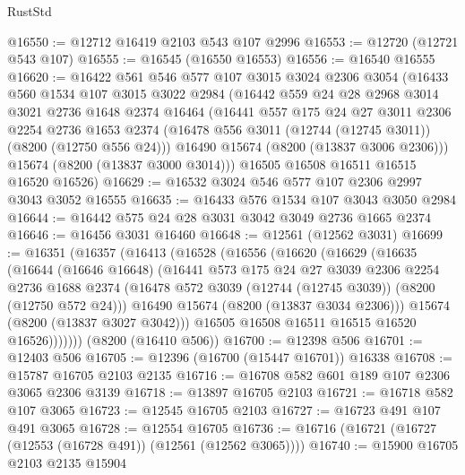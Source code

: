 \begin{lexlean}{RustStd}
\begin{coremodule}
@16550 := @12712 @16419 @2103 @543 @107 @2996
@16553 := @12720 (@12721 @543 @107)
@16555 := @16545 (@16550 @16553)
@16556 := @16540 @16555
@16620 := @16422
    @561
    @546
    @577
    @107
    @3015
    @3024
    @2306
    @3054
    (@16433
      @560
      @1534
      @107
      @3015
      @3022
      @2984
      (@16442
        @559
        @24
        @28
        @2968
        @3014
        @3021
        @2736
        @1648
        @2374
        @16464
        (@16441
          @557
          @175
          @24
          @27
          @3011
          @2306
          @2254
          @2736
          @1653
          @2374
          (@16478 @556 @3011 (@12744 (@12745 @3011)) (@8200 (@12750 @556 @24)))
          @16490
          @15674
          (@8200 (@13837 @3006 @2306)))
        @15674
        (@8200 (@13837 @3000 @3014)))
      @16505
      @16508
      @16511
      @16515
      @16520
      @16526)
@16629 := @16532 @3024 @546 @577 @107 @2306 @2997 @3043 @3052 @16555
@16635 := @16433 @576 @1534 @107 @3043 @3050 @2984
@16644 := @16442 @575 @24 @28 @3031 @3042 @3049 @2736 @1665 @2374
@16646 := @16456 @3031 @16460
@16648 := @12561 (@12562 @3031)
@16699 := @16351
    (@16357
      (@16413
        (@16528
          (@16556
            (@16620
              (@16629
                (@16635
                  (@16644
                    (@16646 @16648)
                    (@16441
                      @573
                      @175
                      @24
                      @27
                      @3039
                      @2306
                      @2254
                      @2736
                      @1688
                      @2374
                      (@16478 @572 @3039 (@12744 (@12745 @3039)) (@8200 (@12750 @572 @24)))
                      @16490
                      @15674
                      (@8200 (@13837 @3034 @2306)))
                    @15674
                    (@8200 (@13837 @3027 @3042)))
                  @16505
                  @16508
                  @16511
                  @16515
                  @16520
                  @16526)))))))
    (@8200 (@16410 @506))
@16700 := @12398 @506
@16701 := @12403 @506
@16705 := @12396 (@16700 (@15447 @16701)) @16338
@16708 := @15787 @16705 @2103 @2135
@16716 := @16708 @582 @601 @189 @107 @2306 @3065 @2306 @3139
@16718 := @13897 @16705 @2103
@16721 := @16718 @582 @107 @3065
@16723 := @12545 @16705 @2103
@16727 := @16723 @491 @107 @491 @3065
@16728 := @12554 @16705
@16736 := @16716 (@16721 (@16727 (@12553 (@16728 @491)) (@12561 (@12562 @3065))))
@16740 := @15900 @16705 @2103 @2135 @15904

\end{coremodule}
\end{lexlean}
